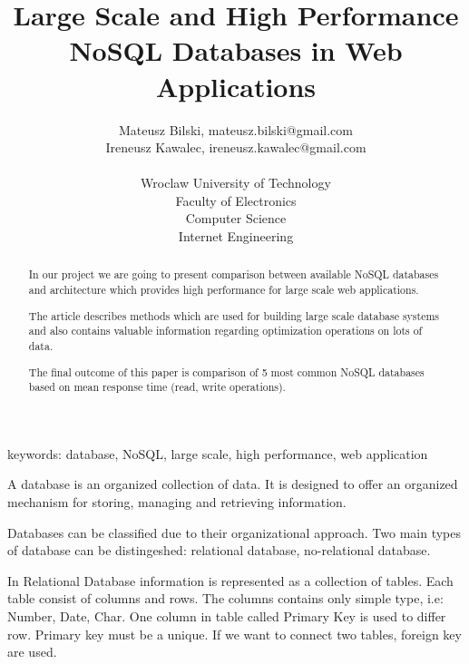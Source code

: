 \documentclass[times, 10pt,twocolumn]{article}
\begin{document}
  

\title{Large Scale and High Performance NoSQL Databases in Web Applications} 
\author{Mateusz Bilski, mateusz.bilski@gmail.com \\ Ireneusz Kawalec, ireneusz.kawalec@gmail.com \\ \\
Wroclaw University of Technology\\ Faculty of Electronics \\ Computer Science \\ Internet Engineering  \\  
} 

\maketitle
\thispagestyle{empty} 

\begin{abstract}   

In our project we are going to present comparison between available NoSQL
databases and architecture which provides high performance for large scale web applications.

The article describes methods which are used for building large scale database
systems and also contains valuable information regarding optimization operations
on lots of data.

The final outcome of this paper is comparison of 5 most common NoSQL
databases based on mean response time (read, write operations).

\end{abstract} 

keywords: database, NoSQL, large scale, high performance, web application 



A database is an organized collection of data. It is designed to offer an organized mechanism for storing, 
managing and retrieving information.

Databases can be classified due to their organizational approach. Two main
types of database can be distingeshed: relational database, no-relational
database.

In Relational Database information is represented as a collection of tables. 
Each table consist of columns and rows. The columns contains only simple
type, i.e: Number, Date, Char. One column in table called Primary Key
is used to differ row. Primary key must be a unique. If we want to connect 
two tables, foreign key are used.
\end{document}
